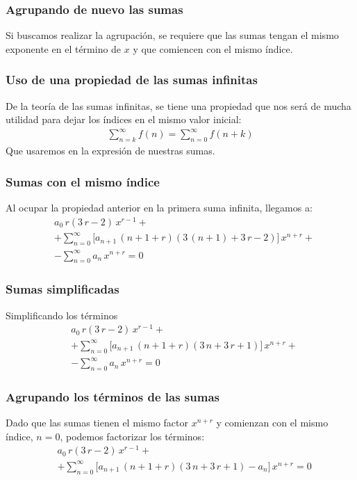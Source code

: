 \documentclass[12pt]{beamer}
\begin{document}
\begin{frame}
\frametitle{Agrupando de nuevo las sumas}
Si buscamos realizar la agrupación, se requiere que las sumas  tengan el mismo exponente en el término de $x$ y que comiencen con el mismo índice.
\end{frame}
\begin{frame}
\frametitle{Uso de una propiedad de las sumas infinitas}
De la teoría de las sumas infinitas, se tiene una propiedad que nos será de mucha utilidad para dejar los índices en el mismo valor inicial:
\pause
\begin{align*}
\sum_{n = k}^{\infty} f(n) = \sum_{n=0}^{\infty} f(n + k)
\end{align*}
Que usaremos en la expresión de nuestras sumas.
\end{frame}
\begin{frame}
\frametitle{Sumas con el mismo índice}
Al ocupar la propiedad anterior en la primera suma infinita, llegamos a:
\begin{align*}
&a_{0} \, r (3 \, r {-}  2) \, x^{r-1} + \\[1em]
&+ \sum_{n=0}^{\infty} \bigg[ a_{n+1} \, (n + 1 {+} r) (3 \, (n + 1) {+}  3 \, r {-} 2 ) \bigg] \, x^{n+r} + \\[1em]
&- \sum_{n=0}^{\infty} a_{n} \, x^{n+r} = 0
\end{align*}
\end{frame}
\begin{frame}
\frametitle{Sumas simplificadas}
Simplificando los términos
\begin{align*}
&a_{0} \, r (3 \, r {-}  2) \, x^{r-1} + \\[1em]
&+ \sum_{n=0}^{\infty} \bigg[ a_{n+1} \, (n + 1 {+} r) (3 \, n {+}  3 \, r {+} 1 ) \bigg] \, x^{n+r} + \\[1em]
&- \sum_{n=0}^{\infty} a_{n} \, x^{n+r} = 0
\end{align*}
\end{frame}
\begin{frame}
\frametitle{Agrupando los términos de las sumas}
Dado que las sumas tienen el mismo factor $x^{n+r}$ y comienzan con el mismo índice, $n = 0$, podemos factorizar los términos:
\pause
\begin{align*}
&a_{0} \, r (3 \, r {-}  2) \, x^{r-1} + \\[1em]
&+ \sum_{n=0}^{\infty} \bigg[ a_{n+1} \, (n + 1 {+} r) (3 \, n {+}  3 \, r {+} 1 ) - a_{n} \bigg] \, x^{n+r} = 0
\end{align*}    
\end{frame}
\end{document}
